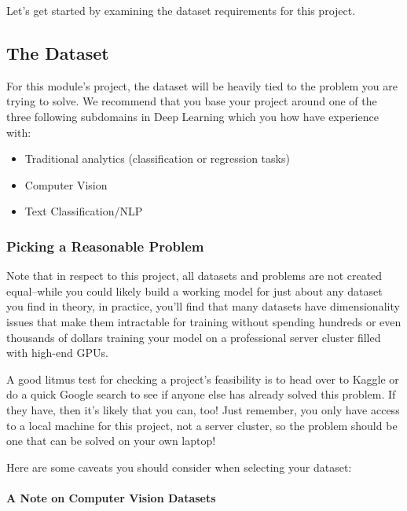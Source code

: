 \documentclass[11pt]{article}
\providecommand{\tightlist}{%
      \setlength{\itemsep}{0pt}\setlength{\parskip}{0pt}}
\begin{document}
Let's get started by examining the dataset requirements for this
project.

\hypertarget{the-dataset}{%
\subsection{The Dataset}\label{the-dataset}}

For this module's project, the dataset will be heavily tied to the
problem you are trying to solve. We recommend that you base your project
around one of the three following subdomains in Deep Learning which you
how have experience with:

\begin{itemize}
\tightlist
\item
  Traditional analytics (classification or regression tasks)
\item
  Computer Vision
\item
  Text Classification/NLP
\end{itemize}

\hypertarget{picking-a-reasonable-problem}{%
\subsubsection{Picking a Reasonable
Problem}\label{picking-a-reasonable-problem}}

Note that in respect to this project, all datasets and problems are not
created equal--while you could likely build a working model for just
about any dataset you find in theory, in practice, you'll find that many
datasets have dimensionality issues that make them intractable for
training without spending hundreds or even thousands of dollars training
your model on a professional server cluster filled with high-end GPUs.

A good litmus test for checking a project's feasibility is to head over
to Kaggle or do a quick Google search to see if anyone else has already
solved this problem. If they have, then it's likely that you can, too!
Just remember, you only have access to a local machine for this project,
not a server cluster, so the problem should be one that can be solved on
your own laptop!

Here are some caveats you should consider when selecting your dataset:

\hypertarget{a-note-on-computer-vision-datasets}{%
\paragraph{A Note on Computer Vision
Datasets}\label{a-note-on-computer-vision-datasets}}
\end{document}
